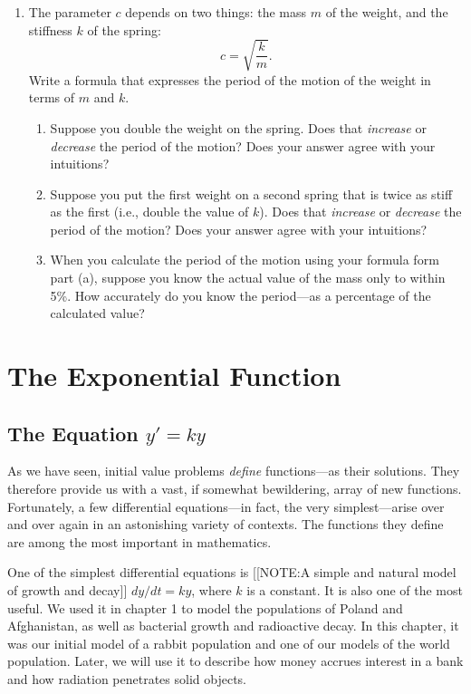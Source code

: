 \begin{enumerate}
\begin{enumerate}
\end{enumerate}
\item The parameter $c$ depends on two things: the mass $m$ of the
weight, and the stiffness $k$ of the spring:
	\[
c = \sqrt{\dfrac{k}{m}}.
\]
Write a formula that expresses the period of the motion of the weight in terms of $m$ and $k$.

  \begin{enumerate}
  \item Suppose you double the weight on the spring.  Does that {\em
  increase\/} or {\em decrease\/} the period of the motion?  Does your
answer agree with your intuitions?

  \item Suppose you put the first weight on a second spring that is twice
as stiff as the first (i.e., double the value of $k$).  Does that {\em
  increase\/} or {\em decrease\/} the period of the motion?  Does your
answer agree with your intuitions?

  \item When you calculate the period of the motion using your formula
form part (a), suppose you know the actual value of the mass only to
within 5\%.  How accurately do you know the period---as a percentage
of the calculated value?
\label{spring-end}


\end{enumerate}
\end{enumerate}
\section{The Exponential Function}
\label{sec:the-exponential-function}

\subsection{The Equation $y'= ky$}
\label{subsec:the-equation-y-ky}

	As we have seen, initial value problems {\em define\/} functions---as their solutions.  They therefore provide us with a vast, if somewhat bewildering, array of new functions.  Fortunately, a few differential equations---in fact, the very simplest---arise over and over again in an astonishing variety of contexts.  The functions they define are among the most important in mathematics.

	One of the simplest differential equations is 
	[[NOTE:A simple and natural model of growth and decay]]
$dy/dt =ky$, where $k$ is a constant.  It is also one of the most useful.  We used it in chapter 1 to model the populations of Poland and Afghanistan, as well as bacterial growth and radioactive decay.  In this chapter, it was our initial model of a rabbit population and one of our models of the world population.  Later, we will use it to describe how money accrues interest in a bank and how radiation penetrates solid objects.


